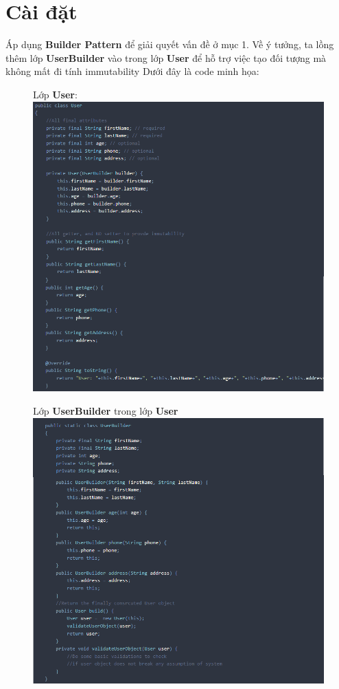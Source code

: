 \section{Cài đặt}
Áp dụng \textbf{Builder Pattern} để giải quyết vấn đề ở mục 1. Về ý tưởng, ta lồng thêm lớp \textbf{UserBuilder} vào trong lớp \textbf{User} để hỗ trợ việc tạo đối tượng mà không mất đi tính immutability
Dưới đây là code minh họa:
\newpage

\begin{figure}[!htb]
    Lớp \textbf{User}:
    \centering
    \includegraphics[width=\textwidth]{fig/Builder/UserPart1.png}
\end{figure}

\begin{figure}
    Lớp \textbf{UserBuilder} trong lớp \textbf{User}
    \centering
     \includegraphics[width=\textwidth]{fig/Builder/UserPart2.png}
\end{figure}

